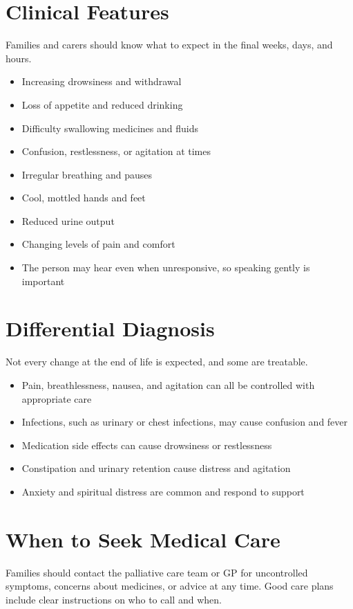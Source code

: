 \section*{Clinical Features}
Families and carers should know what to expect in the final weeks, days, and hours.
\begin{itemize}
    \item Increasing drowsiness and withdrawal
    \item Loss of appetite and reduced drinking
    \item Difficulty swallowing medicines and fluids
    \item Confusion, restlessness, or agitation at times
    \item Irregular breathing and pauses
    \item Cool, mottled hands and feet
    \item Reduced urine output
    \item Changing levels of pain and comfort
    \item The person may hear even when unresponsive, so speaking gently is important
\end{itemize}

\section*{Differential Diagnosis}
Not every change at the end of life is expected, and some are treatable.
\begin{itemize}
    \item Pain, breathlessness, nausea, and agitation can all be controlled with appropriate care
    \item Infections, such as urinary or chest infections, may cause confusion and fever
    \item Medication side effects can cause drowsiness or restlessness
    \item Constipation and urinary retention cause distress and agitation
    \item Anxiety and spiritual distress are common and respond to support
\end{itemize}

\section*{When to Seek Medical Care}
Families should contact the palliative care team or GP for uncontrolled symptoms, concerns about medicines, or advice at any time. Good care plans include clear instructions on who to call and when.

